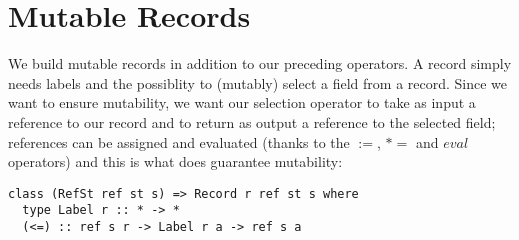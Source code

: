 \section{Mutable Records}
We build mutable records in addition to our preceding operators. A record simply needs labels and the possiblity to (mutably) select a
field from a record. Since we want to ensure mutability, we want our selection operator to take as input a reference to our record and
to return as output a reference to the selected field; references can be assigned and evaluated (thanks to the $:=$, $*=$ and $eval$
operators) and this is what does guarantee mutability:

\begin{verbatim}
class (RefSt ref st s) => Record r ref st s where
  type Label r :: * -> *
  (<=) :: ref s r -> Label r a -> ref s a
\end{verbatim}
